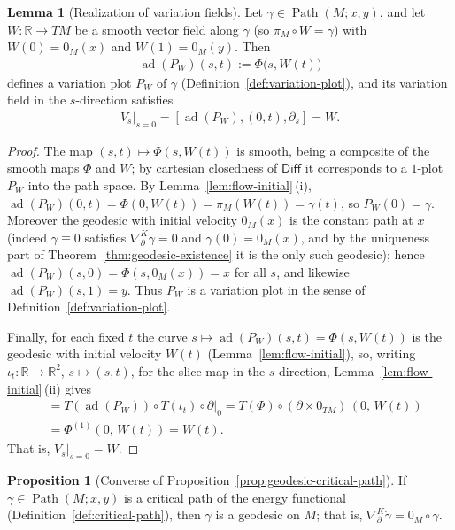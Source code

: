 \documentclass{amsart}
\newcommand{\R}{\mathbb{R}}
\DeclareMathOperator{\Path}{Path}
\DeclareMathOperator{\ad}{ad}
\theoremstyle{definition}
\newtheorem{prop}[thm]{Proposition}
\newtheorem{lem}[thm]{Lemma}
\begin{document}
\begin{lem}[Realization of variation fields]\label{lem:realization}
  Let $\gamma \in \Path(M; x, y)$, and let $W \colon \R \to TM$ be a smooth
  vector field along $\gamma$ (so $\pi_M \circ W = \gamma$) with
  $W(0) = 0_M(x)$ and $W(1) = 0_M(y)$. Then
  \begin{align*}
    \ad(P_W)(s, t) := \Phi\bigl(s, W(t)\bigr)
  \end{align*}
  defines a variation plot $P_W$ of $\gamma$
  (Definition~\ref{def:variation-plot}), and its variation field in the
  $s$-direction satisfies
  \begin{align*}
    \left. V_s \right|_{s=0} = [\ad(P_W), (0, t), \partial_s] = W.
  \end{align*}
\end{lem}

\begin{proof}
  The map $(s, t) \mapsto \Phi(s, W(t))$ is smooth, being a composite of the
  smooth maps $\Phi$ and $W$; by cartesian closedness of $\mathsf{Diff}$ it
  corresponds to a $1$-plot $P_W$ into the path space. By
  Lemma~\ref{lem:flow-initial}\,(i),
  $\ad(P_W)(0, t) = \Phi(0, W(t)) = \pi_M(W(t)) = \gamma(t)$, so $P_W(0) = \gamma$.
  Moreover the geodesic with initial velocity $0_M(x)$ is the constant path at
  $x$ (indeed $\dot\gamma \equiv 0$ satisfies
  $\nabla^{K}_\partial \dot\gamma = 0$ and $\dot\gamma(0) = 0_M(x)$, and by the
  uniqueness part of Theorem~\ref{thm:geodesic-existence} it is the only
  such geodesic); hence $\ad(P_W)(s, 0) = \Phi(s, 0_M(x)) = x$ for all $s$, and
  likewise $\ad(P_W)(s, 1) = y$. Thus $P_W$ is a variation plot in the sense of
  Definition~\ref{def:variation-plot}.

  Finally, for each fixed $t$ the curve
  $s \mapsto \ad(P_W)(s, t) = \Phi(s, W(t))$ is the geodesic with initial
  velocity $W(t)$ (Lemma~\ref{lem:flow-initial}), so, writing
  $\iota_t \colon \R \to \R^2$, $s \mapsto (s, t)$, for the slice map in the
  $s$-direction, Lemma~\ref{lem:flow-initial}\,(ii) gives
  \begin{align*}
   [\ad(P_W),(0,t),\partial_s]
     &= T(\ad(P_W))\circ T(\iota_t)\circ\partial\big|_0
      = T(\Phi)\circ(\partial\times 0_{TM})\,(0,\,W(t)) \\
     &= \Phi^{(1)}(0,\,W(t))
      = W(t).
  \end{align*}
  That is, $V_s|_{s=0} = W$.
\end{proof}

\begin{prop}[Converse of Proposition~\ref{prop:geodesic-critical-path}]%
\label{prop:critical-geodesic}
  If $\gamma \in \Path(M; x, y)$ is a critical path of the energy functional
  (Definition~\ref{def:critical-path}), then $\gamma$ is a geodesic on $M$;
  that is, $\nabla^{K}_\partial \dot\gamma = 0_M \circ \gamma$.
\end{prop}
\end{document}
